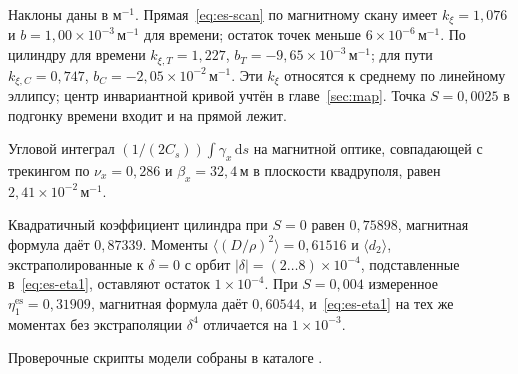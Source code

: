 \documentclass[aps,pra,preprint,a4paper,amsmath,amssymb,longbibliography]{revtex4-2}
\begin{document}
Наклоны даны в м$^{-1}$. Прямая~\eqref{eq:es-scan} по магнитному скану имеет $k_{\xi}=1{,}076$ и $b=1{,}00\times 10^{-3}\,\text{м}^{-1}$ для времени; остаток точек меньше $6\times 10^{-6}\,\text{м}^{-1}$. По цилиндру для времени $k_{\xi,T}=1{,}227$, $b_T=-9{,}65\times 10^{-3}\,\text{м}^{-1}$; для пути $k_{\xi,C}=0{,}747$, $b_C=-2{,}05\times 10^{-2}\,\text{м}^{-1}$. Эти $k_{\xi}$ относятся к среднему по линейному эллипсу; центр инвариантной кривой учтён в главе~\ref{sec:map}. Точка $S=0{,}0025$ в подгонку времени входит и на прямой лежит.

Угловой интеграл $(1/(2C_s))\int\gamma_x\,\mathrm{d}s$ на магнитной оптике, совпадающей с трекингом по $\nu_x=0{,}286$ и $\beta_x=32{,}4\,\text{м}$ в плоскости квадруполя, равен $2{,}41\times 10^{-2}\,\text{м}^{-1}$.

Квадратичный коэффициент цилиндра при $S=0$ равен $0{,}75898$, магнитная формула даёт $0{,}87339$. Моменты $\langle(D/\rho)^2\rangle=0{,}61516$ и $\langle d_2\rangle$, экстраполированные к $\delta=0$ с орбит $|\delta|=(2\ldots 8)\times 10^{-4}$, подставленные в~\eqref{eq:es-eta1}, оставляют остаток $1\times 10^{-4}$. При $S=0{,}004$ измеренное $\eta_1^{\mathrm{es}}=0{,}31909$, магнитная формула даёт $0{,}60544$, и~\eqref{eq:es-eta1} на тех же моментах без экстраполяции $\delta^4$ отличается на $1\times 10^{-3}$.

Проверочные скрипты модели собраны в каталоге .


\end{document}
